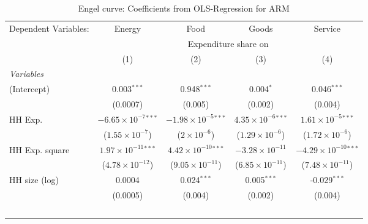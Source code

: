 
\begin{table}[htbp!]
   \centering
   \small
   \begin{adjustbox}{width = 1\textwidth, max height = 0.95\textheight, center}
      \begin{threeparttable}[b]
         \caption{\label{tab:Engel_parametric_ARM} Engel curve: Coefficients from OLS-Regression for ARM}
         \begin{tabular}{lcccc}
            \tabularnewline \midrule \midrule
            Dependent Variables: & Energy                         & Food                           & Goods                         & Service\\  
             & \multicolumn{4}{c}{Expenditure share on} \\ 
                                 & (1)                            & (2)                            & (3)                           & (4)\\  
            \midrule
            \emph{Variables}\\
            (Intercept)          & 0.003$^{***}$                  & 0.948$^{***}$                  & 0.004$^{*}$                   & 0.046$^{***}$\\   
                                 & (0.0007)                       & (0.005)                        & (0.002)                       & (0.004)\\   
            HH Exp.              & $-6.65\times 10^{-7}$$^{***}$  & $-1.98\times 10^{-5}$$^{***}$  & $4.35\times 10^{-6}$$^{***}$  & $1.61\times 10^{-5}$$^{***}$\\    
                                 & ($1.55\times 10^{-7}$)         & ($2\times 10^{-6}$)            & ($1.29\times 10^{-6}$)        & ($1.72\times 10^{-6}$)\\    
            HH Exp. square       & $1.97\times 10^{-11}$$^{***}$  & $4.42\times 10^{-10}$$^{***}$  & $-3.28\times 10^{-11}$        & $-4.29\times 10^{-10}$$^{***}$\\    
                                 & ($4.78\times 10^{-12}$)        & ($9.05\times 10^{-11}$)        & ($6.85\times 10^{-11}$)       & ($7.48\times 10^{-11}$)\\    
            HH size (log)        & 0.0004                         & 0.024$^{***}$                  & 0.005$^{***}$                 & -0.029$^{***}$\\   
                                 & (0.0005)                       & (0.004)                        & (0.002)                       & (0.004)\\   
$$
\end{tabular}
\end{threeparttable}
\end{adjustbox}
\end{table}
